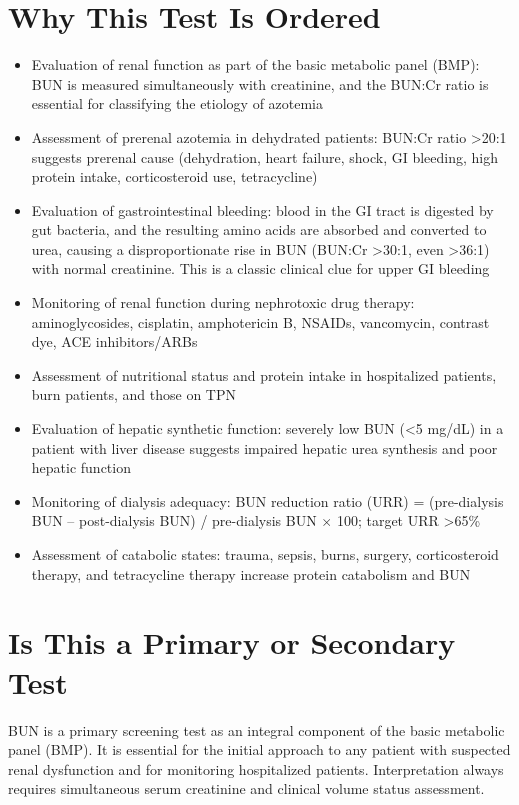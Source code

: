 \section*{Why This Test Is Ordered}
\begin{itemize}
  \item Evaluation of renal function as part of the basic metabolic panel (BMP): BUN is measured simultaneously with creatinine, and the BUN:Cr ratio is essential for classifying the etiology of azotemia
  \item Assessment of prerenal azotemia in dehydrated patients: BUN:Cr ratio >20:1 suggests prerenal cause (dehydration, heart failure, shock, GI bleeding, high protein intake, corticosteroid use, tetracycline)
  \item Evaluation of gastrointestinal bleeding: blood in the GI tract is digested by gut bacteria, and the resulting amino acids are absorbed and converted to urea, causing a disproportionate rise in BUN (BUN:Cr >30:1, even >36:1) with normal creatinine. This is a classic clinical clue for upper GI bleeding
  \item Monitoring of renal function during nephrotoxic drug therapy: aminoglycosides, cisplatin, amphotericin B, NSAIDs, vancomycin, contrast dye, ACE inhibitors/ARBs
  \item Assessment of nutritional status and protein intake in hospitalized patients, burn patients, and those on TPN
  \item Evaluation of hepatic synthetic function: severely low BUN (<5 mg/dL) in a patient with liver disease suggests impaired hepatic urea synthesis and poor hepatic function
  \item Monitoring of dialysis adequacy: BUN reduction ratio (URR) = (pre-dialysis BUN -- post-dialysis BUN) / pre-dialysis BUN $\times$ 100; target URR >65\%
  \item Assessment of catabolic states: trauma, sepsis, burns, surgery, corticosteroid therapy, and tetracycline therapy increase protein catabolism and BUN
\end{itemize}

\section*{Is This a Primary or Secondary Test}
BUN is a primary screening test as an integral component of the basic metabolic panel (BMP). It is essential for the initial approach to any patient with suspected renal dysfunction and for monitoring hospitalized patients. Interpretation always requires simultaneous serum creatinine and clinical volume status assessment.

